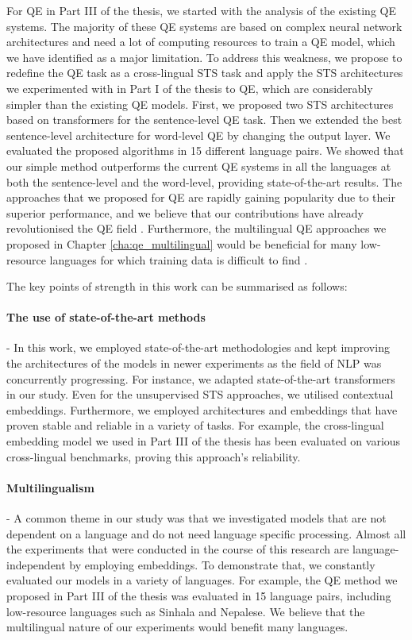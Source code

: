 For QE in Part III of the thesis, we started with the analysis of the existing QE systems. The majority of these QE systems are based on complex neural network architectures and need a lot of computing resources to train a QE model, which we have identified as a major limitation. To address this weakness, we propose to redefine the QE task as a cross-lingual STS task and apply the STS architectures we experimented with in Part I of the thesis to QE, which are considerably simpler than the existing QE models. First, we proposed two STS architectures based on transformers for the sentence-level QE task. Then we extended the best sentence-level architecture for word-level QE by changing the output layer. We evaluated the proposed algorithms in 15 different language pairs. We showed that our simple method outperforms the current QE systems in all the languages at both the sentence-level and the word-level, providing state-of-the-art results. The approaches that we proposed for QE are rapidly gaining popularity due to their superior performance, and we believe that our contributions have already revolutionised the QE field \autocite{ranasinghe-etal-2020-transquest, ranasinghe-etal-2020-transquest-wmt2020}.  Furthermore, the multilingual QE approaches we proposed in Chapter \ref{cha:qe_multilingual} would be beneficial for many low-resource languages for which training data is difficult to find \autocite{ranasinghe-etal-2021-exploratory}.

The key points of strength in this work can be summarised as follows:


\paragraph{The use of state-of-the-art methods} - In this work, we employed state-of-the-art methodologies and kept improving the architectures of the models in newer experiments as the field of NLP was concurrently progressing. For instance, we adapted state-of-the-art transformers in our study. Even for the unsupervised STS approaches, we utilised contextual embeddings. Furthermore, we employed architectures and embeddings that have proven stable and reliable in a variety of tasks. For example, the cross-lingual embedding model we used in Part III of the thesis has been evaluated on various cross-lingual benchmarks, proving this approach's reliability.

\paragraph{Multilingualism} - A common theme in our study was that we investigated models that are not dependent on a language and do not need language specific processing. Almost all the experiments that were conducted in the course of this research are language-independent by employing embeddings. To demonstrate that, we constantly evaluated our models in a variety of languages. For example, the QE method we proposed in Part III of the thesis was evaluated in 15 language pairs, including low-resource languages such as Sinhala and Nepalese. We believe that the multilingual nature of our experiments would benefit many languages. 

